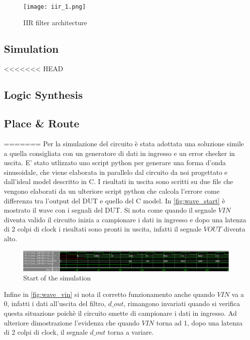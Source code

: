 \begin{figure}[h]
	\center
	\texttt{[image: iir\_1.png]}
	\caption{IIR filter architecture}
	\label{fig:IIR_1}
\end{figure}

\subsection{Simulation}
<<<<<<< HEAD

\subsection{Logic Synthesis}

\subsection{Place \& Route}
=======
Per la simulazione del circuito è stata adottata una soluzione simile a quella consigliata con un generatore di dati in ingresso e un error checker in uscita. E' stato utlizzato uno script python per generare una forma d'onda sinusoidale, che viene elaborata in parallelo dal circuito da noi progettato e dall'ideal model descritto in C. I risultati in uscita sono scritti su due file che vengono elaborati da un ulteriore script python che calcola l'errore come differenza tra l'output del DUT e quello del C model.
In \autoref{fig:wave_start} è mostrato il wave con i segnali del DUT. Si nota come quando il segnale $VIN$ diventa valido il circuito inizia a campionare i dati in ingresso e dopo una latenza di 2 colpi di clock i risultati sono pronti in uscita, infatti il segnale $VOUT$ diventa alto.

\begin{figure}[h]
	\center
	\includegraphics[width=1\textwidth]{images/wave_start.png}
	\caption{Start of the simulation}
	\label{fig:wave_start}
\end{figure}

Infine in \autoref{fig:wave_vin} si nota il corretto funzionamento anche quando $VIN$ va a 0, infatti i dati all'uscita del filtro, $d\_out$, rimangono invariati quando si verifica questa situazione poichè il circuito smette di campionare i dati in ingresso. Ad ulteriore dimostrazione l'evidenza che quando $VIN$ torna ad 1, dopo una latenza di 2 colpi di clock, il segnale $d\_out$ torna a variare.

